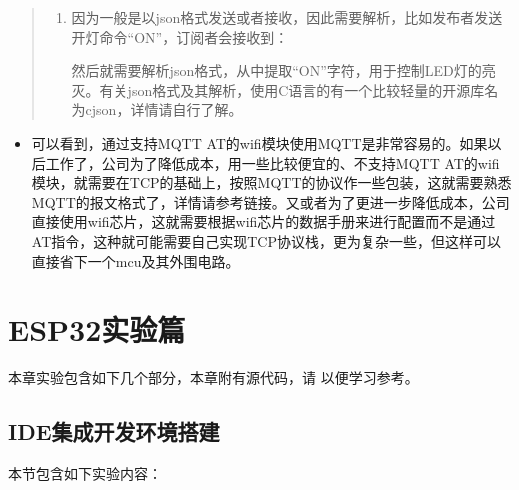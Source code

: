 \documentclass[a4paper,12pt,english]{sphinxmanual}
\begin{document}
\begin{quote}
\sphinxAtStartPar
{}
\begin{enumerate}
%
\setcounter{enumi}{4}
\item {} 
\sphinxAtStartPar
因为一般是以json格式发送或者接收，因此需要解析，比如发布者发送开灯命令“ON”，订阅者会接收到：

\begin{sphinxVerbatim}[commandchars=\\\{\}]
\end{sphinxVerbatim}

\sphinxAtStartPar
然后就需要解析json格式，从中提取“ON”字符，用于控制LED灯的亮灭。有关json格式及其解析，使用C语言的有一个比较轻量的开源库名为cjson，详情请自行了解。

\end{enumerate}

\sphinxAtStartPar
{}
\end{quote}
\begin{itemize}
\item {} 
\sphinxAtStartPar
可以看到，通过支持MQTT AT的wifi模块使用MQTT是非常容易的。如果以后工作了，公司为了降低成本，用一些比较便宜的、不支持MQTT AT的wifi模块，就需要在TCP的基础上，按照MQTT的协议作一些包装，这就需要熟悉MQTT的报文格式了，详情请参考链接。又或者为了更进一步降低成本，公司直接使用wifi芯片，这就需要根据wifi芯片的数据手册来进行配置而不是通过AT指令，这种就可能需要自己实现TCP协议栈，更为复杂一些，但这样可以直接省下一个mcu及其外围电路。

\end{itemize}

\sphinxstepscope

\sphinxstepscope


\chapter{ESP32实验篇}
\label{\detokenize{exp-esp32/index:esp32}}\label{\detokenize{exp-esp32/index::doc}}
\sphinxAtStartPar
本章实验包含如下几个部分，本章附有源代码，请  以便学习参考。

\sphinxstepscope


\section{IDE集成开发环境搭建}
\label{\detokenize{exp-esp32/ide/index:ide}}\label{\detokenize{exp-esp32/ide/index::doc}}
\sphinxAtStartPar
本节包含如下实验内容：
\end{document}
